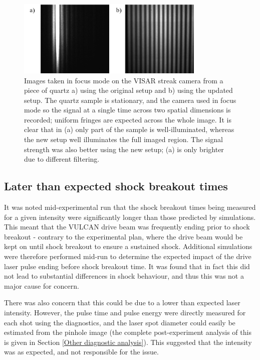 \begin{figure}
\begin{centering}
\includegraphics[width=0.8\textwidth]{figures/Experiment/VISAR before and after.png}%
\caption{\label{fig:VISAR before and after} Images taken in focus mode on the VISAR streak camera from a piece of quartz a) using the original setup and b) using the updated setup. The quartz sample is stationary, and the camera used in focus mode so the signal at a single time across two spatial dimensions is recorded; uniform fringes are expected across the whole image. It is clear that in (a) only part of the sample is well-illuminated, whereas the new setup well illuminates the full imaged region. The signal strength was also better using the new setup; (a) is only brighter due to different filtering.}
\end{centering}
\end{figure}

\subsection{Later than expected shock breakout times}

It was noted mid-experimental run that the shock breakout times being measured for a given intensity were significantly longer than those predicted by simulations. This meant that the VULCAN drive beam was frequently ending prior to shock breakout - contrary to the experimental plan, where the drive beam would be kept on until shock breakout to ensure a sustained shock. Additional simulations were therefore performed mid-run to determine the expected impact of the drive laser pulse ending before shock breakout time. It was found that in fact this did not lead to substantial differences in shock behaviour, and thus this was not a major cause for concern.

There was also concern that this could be due to a lower than expected laser intensity. However, the pulse time and pulse energy were directly measured for each shot using the diagnostics, and the laser spot diameter could easily be estimated from the pinhole image (the complete post-experiment analysis of this is given in Section \ref{Other diagnostic analysis}). This suggested that the intensity was as expected, and not responsible for the issue.

